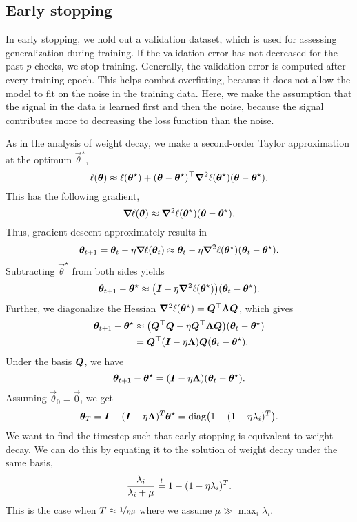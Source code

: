 \subsection{Early stopping}

In early stopping, we hold out a validation dataset, which is used for assessing generalization
during training. If the validation error has not decreased for the past $p$ checks, we stop
training. Generally, the validation error is computed after every training epoch. This helps combat
overfitting, because it does not allow the model to fit on the noise in the training data. Here, we
make the assumption that the signal in the data is learned first and then the noise, because the
signal contributes more to decreasing the loss function than the noise.

As in the analysis of weight decay, we make a second-order Taylor approximation at the optimum
$\vec{\theta}^\star$, \[
    \ell(\bm{\theta}) \approx \ell(\bm{\theta}^\star) + (\bm{\theta} - \bm{\theta}^\star)^\top \bm{\nabla}^2_{\! } \ell(\bm{\theta}^\star) (\bm{\theta} - \bm{\theta}^\star).
\]
This has the following gradient, \[
    \bm{\nabla}_{\! } \ell(\bm{\theta}) \approx \bm{\nabla}^2_{\! } \ell(\bm{\theta}^\star) (\bm{\theta} - \bm{\theta}^\star).
\]
Thus, gradient descent approximately results in \[
    \bm{\theta}_{t+1} = \bm{\theta}_t - \eta \bm{\nabla}_{\! } \ell(\bm{\theta}_t) \approx \bm{\theta}_t - \eta \bm{\nabla}^2_{\! } \ell(\bm{\theta}^\star) (\bm{\theta}_t - \bm{\theta}^\star).
\]
Subtracting $\vec{\theta}^\star$ from both sides yields \[
    \vec{\theta}_{t+1} - \vec{\theta}^\star \approx \lft( \mat{I} - \eta \hess{\ell(\vec{\theta}^\star)}{} \rgt) (\vec{\theta}_t - \vec{\theta}^\star).
\]
Further, we diagonalize the Hessian $\bm{\nabla}^2_{\! } \ell(\bm{\theta}^\star) = \bm{Q}^\top
    \bm{\Lambda} \bm{Q}$, which gives
\begin{align*}
    \vec{\theta}_{t+1} - \vec{\theta}^\star & \approx \lft( \transpose{\mat{Q}}\mat{Q} - \eta \transpose{\mat{Q}} \mat{\Lambda} \mat{Q} \rgt) (\vec{\theta}_t - \vec{\theta}^\star) \\
                                            & = \transpose{\mat{Q}} \lft( \mat{I} - \eta \mat{\Lambda} \rgt) \mat{Q} (\vec{\theta}_t - \vec{\theta}^\star).
\end{align*}
Under the basis $\bm{Q}$, we have \[
    \vec{\theta}_{t+1} - \vec{\theta}^\star = \lft( \mat{I} - \eta \mat{\Lambda} \rgt) (\vec{\theta}_t - \vec{\theta}^\star).
\]
Assuming $\vec{\theta}_0 = \vec{0}$, we get \[
    \vec{\theta}_T = \mat{I} - (\mat{I}-\eta \mat{\Lambda})^T \vec{\theta}^\star = \mathrm{diag}\lft( 1 - (1-\eta \lambda_i)^T \rgt).
\]
We want to find the timestep such that early stopping is equivalent to weight decay. We can do this
by equating it to the solution of weight decay under the same basis, \[
    \frac{\lambda_i}{\lambda_i + \mu} \overset{!}{=} 1 - (1-\eta \lambda_i)^T.
\]
This is the case when $T \approx \nicefrac{1}{\eta \mu}$ where we assume $\mu \gg \max_{i}
    \lambda_i$.

